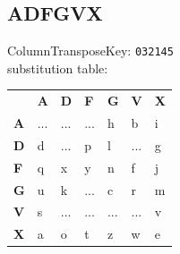 \documentclass{article}
\begin{document}
\subsection{ADFGVX}
ColumnTransposeKey: \texttt{032145}\\
substitution table:
\\
\begin{table}[H]
\begin{tabular}{lllllll}
\textbf{} &
  \textbf{A} &
  \textbf{D} &
  \textbf{F} &
  \textbf{G} &
  \textbf{V} &
  \textbf{X} \\ \cline{2-7}
\multicolumn{1}{l|}{\textbf{A}} &
  \multicolumn{1}{l|}{...} &
  \multicolumn{1}{l|}{...} &
  \multicolumn{1}{l|}{...} &
  \multicolumn{1}{l|}{h} &
  \multicolumn{1}{l|}{b} &
  \multicolumn{1}{l|}{i} \\ \cline{2-7}
\multicolumn{1}{l|}{\textbf{D}} &
  \multicolumn{1}{l|}{d} &
  \multicolumn{1}{l|}{...} &
  \multicolumn{1}{l|}{p} &
  \multicolumn{1}{l|}{l} &
  \multicolumn{1}{l|}{...} &
  \multicolumn{1}{l|}{g} \\ \cline{2-7}
\multicolumn{1}{l|}{\textbf{F}} &
  \multicolumn{1}{l|}{q} &
  \multicolumn{1}{l|}{x} &
  \multicolumn{1}{l|}{y} &
  \multicolumn{1}{l|}{n} &
  \multicolumn{1}{l|}{f} &
  \multicolumn{1}{l|}{j} \\ \cline{2-7}
\multicolumn{1}{l|}{\textbf{G}} &
  \multicolumn{1}{l|}{u} &
  \multicolumn{1}{l|}{k} &
  \multicolumn{1}{l|}{...} &
  \multicolumn{1}{l|}{c} &
  \multicolumn{1}{l|}{r} &
  \multicolumn{1}{l|}{m} \\ \cline{2-7}
\multicolumn{1}{l|}{\textbf{V}} &
  \multicolumn{1}{l|}{s} &
  \multicolumn{1}{l|}{...} &
  \multicolumn{1}{l|}{...} &
  \multicolumn{1}{l|}{...} &
  \multicolumn{1}{l|}{...} &
  \multicolumn{1}{l|}{v} \\ \cline{2-7}
\multicolumn{1}{l|}{\textbf{X}} &
  \multicolumn{1}{l|}{a} &
  \multicolumn{1}{l|}{o} &
  \multicolumn{1}{l|}{t} &
  \multicolumn{1}{l|}{z} &
  \multicolumn{1}{l|}{w} &
  \multicolumn{1}{l|}{e} \\ \cline{2-7}
\end{tabular}
\end{table}
\end{document}
